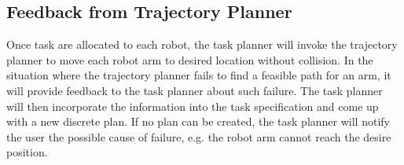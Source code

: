 \subsection{Feedback from Trajectory Planner}
Once task are allocated to each robot, the task planner will invoke the trajectory planner to move each robot arm to desired location without collision.
In the situation where the trajectory planner fails to find a feasible path for an arm,
it will provide feedback to the task planner about such failure.
The task planner will then incorporate the information into the task specification and come up with a new discrete plan.
If no plan can be created, the task planner will notify the user the possible cause of failure, e.g. the robot arm cannot reach the desire position. 